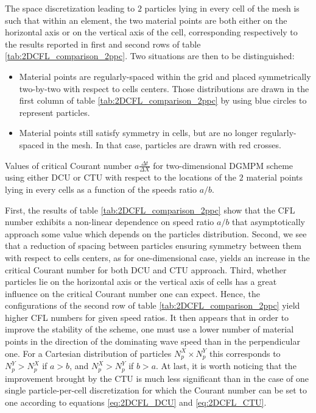 The space discretization leading to $2$ particles lying in every cell of the mesh is such that within an element, the two material points are both either on the horizontal axis or on the vertical axis of the cell, corresponding respectively to the results reported in first and second rows of table \ref{tab:2DCFL_comparison_2ppc}. Two situations are then to be distinguished:
\begin{itemize}
\item Material points are regularly-spaced within the grid and placed symmetrically two-by-two with respect to cells centers. Those distributions are drawn in the first column of table \ref{tab:2DCFL_comparison_2ppc} by using blue circles to represent particles.
\item Material points still satisfy symmetry in cells, but are no longer regularly-spaced in the mesh. In that case, particles are drawn with red crosses.
\end{itemize}
\begin{table}[h]
  \centering
  
  \caption{Values of critical Courant number $a\frac{\Delta t}{\Delta X}$ for two-dimensional DGMPM scheme using either DCU or CTU with respect to the locations of the $2$ material points lying in every cells as a function of the speeds ratio $a/b$.}
  \label{tab:2DCFL_comparison_2ppc}
\end{table}
First, the results of table \ref{tab:2DCFL_comparison_2ppc} show that the CFL number exhibits a non-linear dependence on speed ratio $a/b$ that asymptotically approach some value which depends on the particles distribution. Second, we see that a reduction of spacing between particles ensuring symmetry between them with respect to cells centers, as for one-dimensional case, yields an increase in the critical Courant number for both DCU and CTU approach. 
Third, whether particles lie on the horizontal axis or the vertical axis of cells has a great influence on the critical Courant number one can expect. Hence, the configurations of the second row of table \ref{tab:2DCFL_comparison_2ppc} yield higher CFL numbers for given speed ratios. It then appears that in order to improve the stability of the scheme, one must use a lower number of material points in the direction of the dominating wave speed than in the perpendicular one. For a Cartesian distribution of particles $N_p^X \times N_p^Y$ this corresponds to $N_p^Y > N_p^X$ if $a>b$, and $N_p^X > N_p^Y$ if $b>a$.
At last, it is worth noticing that the improvement brought by the CTU is much less significant than in the case of one single particle-per-cell discretization for which the Courant number can be set to one according to equations \eqref{eq:2DCFL_DCU} and \eqref{eq:2DCFL_CTU}.

